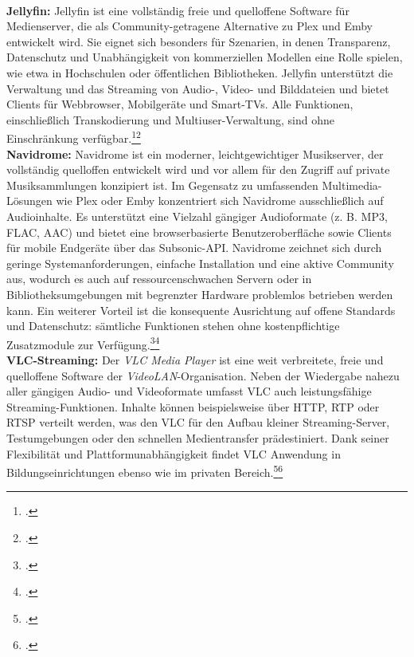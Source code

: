 \documentclass[12pt,a4paper]{report}
\begin{document}
  \\
  \newline
  \textbf{Jellyfin:}
  Jellyfin ist eine vollständig freie und quelloffene Software für Medienserver, die als Community-getragene Alternative zu Plex und Emby entwickelt wird. 
  Sie eignet sich besonders für Szenarien, in denen Transparenz, Datenschutz 
  und Unabhängigkeit von kommerziellen Modellen eine Rolle spielen, wie etwa in Hochschulen oder öffentlichen Bibliotheken. 
  Jellyfin unterstützt die Verwaltung und das Streaming von Audio-, Video- und Bilddateien und bietet Clients für Webbrowser, Mobilgeräte und Smart-TVs. 
  Alle Funktionen, einschließlich Transkodierung und Multiuser-Verwaltung, 
  sind ohne Einschränkung verfügbar.\footcite[Vgl.][]{wikipedia_jellyfin}\footcite[Vgl.][]{jellyfin_docs}
  \\
  \newline
  \textbf{Navidrome:}
  Navidrome ist ein moderner, leichtgewichtiger Musikserver, der vollständig quelloffen entwickelt wird und vor allem für den Zugriff auf private Musiksammlungen konzipiert ist.
  Im Gegensatz zu umfassenden Multimedia-Lösungen wie Plex oder Emby konzentriert sich Navidrome ausschließlich auf Audioinhalte.
  Es unterstützt eine Vielzahl gängiger Audioformate (z. B. \ac{MP3}, \ac{FLAC}, \ac{AAC}) und bietet eine browserbasierte Benutzeroberfläche 
  sowie Clients für mobile Endgeräte über das Subsonic-\ac{API}.
  Navidrome zeichnet sich durch geringe Systemanforderungen, einfache Installation und eine aktive Community aus, 
  wodurch es auch auf ressourcenschwachen Servern oder in Bibliotheksumgebungen mit begrenzter Hardware problemlos betrieben werden kann.
  Ein weiterer Vorteil ist die konsequente Ausrichtung auf offene Standards 
  und Datenschutz: sämtliche Funktionen stehen ohne kostenpflichtige Zusatzmodule zur Verfügung.\footcite[Vgl.][]{navidrome2024}\footcite[Vgl.][]{wikipedia_navidrome}
  \\
  \newline  
  \textbf{VLC-Streaming:}
  Der \emph{VLC Media Player} ist eine weit verbreitete, freie und quelloffene Software der \emph{VideoLAN}-Organisation. 
  Neben der Wiedergabe nahezu aller gängigen Audio- und Videoformate umfasst VLC auch leistungsfähige Streaming-Funktionen. 
  Inhalte können beispielsweise über \ac{HTTP}, \ac{RTP} oder \ac{RTSP} verteilt werden, was den VLC für den Aufbau kleiner Streaming-Server, 
  Testumgebungen oder den schnellen Medientransfer prädestiniert. 
  Dank seiner Flexibilität und Plattformunabhängigkeit findet VLC Anwendung in Bildungseinrichtungen ebenso wie im privaten Bereich.\footcite[Vgl.][]{wikipedia_vlc}\footcite[Vgl.][]{vlc_docs}  
\end{document}
